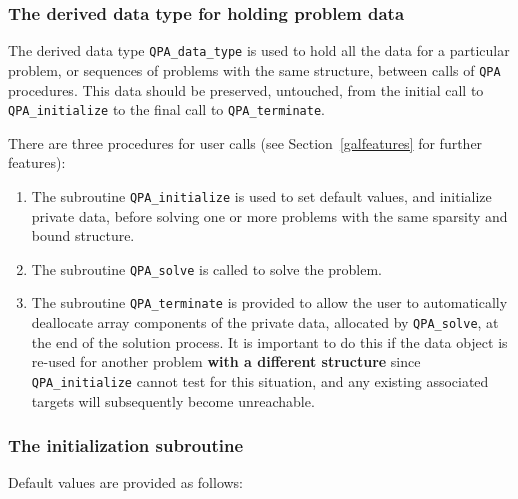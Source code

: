 \documentclass{galahad}
\newcommand{\packagename}{QPA}
\begin{document}




\subsubsection{The derived data type for holding problem data}\label{typedata}
The derived data type 
{\tt \packagename\_data\_type} 
is used to hold all the data for a particular problem,
or sequences of problems with the same structure, between calls of 
{\tt \packagename} procedures. 
This data should be preserved, untouched, from the initial call to 
{\tt \packagename\_initialize}
to the final call to
{\tt \packagename\_terminate}.


\galarguments
There are three procedures for user calls
(see Section~\ref{galfeatures} for further features): 

\begin{enumerate}
\item The subroutine 
      {\tt \packagename\_initialize} 
      is used to set default values, and initialize private data, 
      before solving one or more problems with the
      same sparsity and bound structure.
\item The subroutine 
      {\tt \packagename\_solve} 
      is called to solve the problem.
\item The subroutine 
      {\tt \packagename\_terminate} 
      is provided to allow the user to automatically deallocate array 
       components of the private data, allocated by 
       {\tt \packagename\_solve}, 
       at the end of the solution process. 
       It is important to do this if the data object is re-used for another 
       problem {\bf with a different structure}
       since {\tt \packagename\_initialize} cannot test for this situation, 
       and any existing associated targets will subsequently become unreachable.
\end{enumerate}


\subsubsection{The initialization subroutine}\label{subinit}
 Default values are provided as follows:
\vspace*{1mm}
\end{document}

